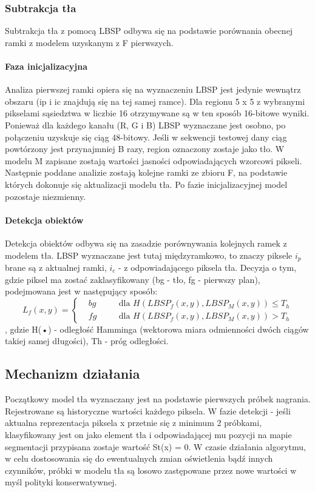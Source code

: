 \subsubsection{Subtrakcja tła}
Subtrakcja tła z pomocą LBSP odbywa się na podstawie porównania obecnej ramki z modelem uzyskanym z F pierwszych. 
\paragraph{Faza inicjalizacyjna \\}
Analiza pierwszej ramki opiera się na wyznaczeniu LBSP  jest jedynie wewnątrz obszaru (ip i ic znajdują się na tej samej ramce). Dla regionu 5 x 5 z wybranymi pikselami sąsiedztwa w liczbie 16 otrzymywane są w ten sposób 16-bitowe wyniki. Ponieważ dla każdego kanału (R, G i B) LBSP wyznaczane jest osobno, po połączeniu uzyskuje się ciąg 48-bitowy. Jeśli w sekwencji testowej dany ciąg powtórzony jest przynajmniej B razy, region oznaczony zostaje jako tło. W modelu M zapisane zostają wartości jasności odpowiadających wzorcowi pikseli. Następnie poddane analizie zostają kolejne ramki ze zbioru F, na podstawie których dokonuje się aktualizacji modelu tła. Po fazie inicjalizacyjnej model pozostaje niezmienny.
\paragraph{Detekcja obiektów \\}
Detekcja obiektów odbywa się na zasadzie porównywania kolejnych ramek z modelem tła. LBSP wyznaczane jest tutaj międzyramkowo, to znaczy piksele $i_{p}$ brane są z aktualnej ramki, $i_{c}$ - z odpowiadającego piksela tła. Decyzja o tym, gdzie piksel ma zostać zaklasyfikowany (bg - tło, fg - pierwszy plan), podejmowana jest w następujący sposób:
\begin{equation}
L_{f}(x,y)=\left\{
\begin{split}
&bg & \quad &\text{dla $H(LBSP_{f}(x,y),LBSP_{M}(x,y))\leq T_{h}$} \\
&fg & \quad &\text{dla $H(LBSP_{f}(x,y),LBSP_{M}(x,y))>T_{h}$}
\end{split}
\right.
\end{equation}
, gdzie H(•) - odległość Hamminga (wektorowa miara odmienności dwóch ciągów takiej samej długości), Th - próg odległości.
\subsection{Mechanizm działania}
Początkowy model tła wyznaczany jest na podstawie pierwszych próbek nagrania. Rejestrowane są historyczne wartości każdego piksela. W fazie detekcji - jeśli aktualna reprezentacja piksela x przetnie się z minimum 2 próbkami, klasyfikowany jest on jako element tła i odpowiadającej mu pozycji na mapie segmentacji przypisana zostaje wartość St(x) = 0. W czasie działania algorytmu, w celu dostosowania się do ewentualnych zmian oświetlenia bądź innych czynników, próbki w modelu tła są losowo zastępowane przez nowe wartości w myśl polityki konserwatywnej.
